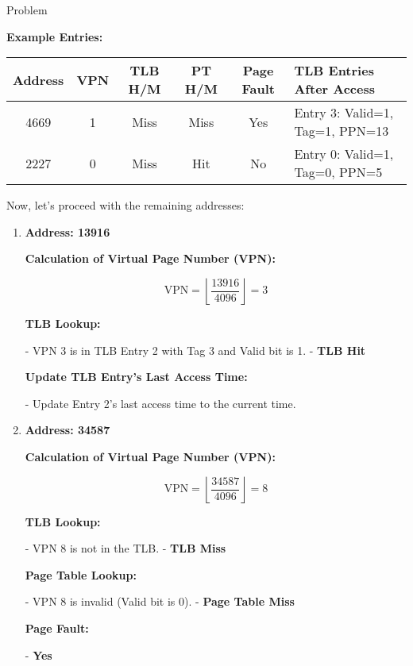 \begin{problem}{}{Problem}
	\bigskip
	
	\textbf{Example Entries:}
	
	\begin{center}
		\begin{tabular}{|c|c|c|c|c|l|}
			\hline
			\textbf{Address} & \textbf{VPN} & \textbf{TLB H/M} & \textbf{PT H/M} & \textbf{Page Fault} & \textbf{TLB Entries After Access} \\
			\hline
			4669 & 1 & Miss & Miss & Yes & Entry 3: Valid=1, Tag=1, PPN=13 \\
			\hline
			2227 & 0 & Miss & Hit & No & Entry 0: Valid=1, Tag=0, PPN=5 \\
			\hline
		\end{tabular}
	\end{center}
	
	\bigskip
	
	Now, let's proceed with the remaining addresses:
	
	\begin{enumerate}[label=\arabic*.]
		\item \textbf{Address: 13916}
		
		\textbf{Calculation of Virtual Page Number (VPN):}
		
		\[
		\text{VPN} = \left\lfloor \dfrac{13916}{4096} \right\rfloor = 3
		\]
		
		\textbf{TLB Lookup:}
		
		- VPN 3 is in TLB Entry 2 with Tag 3 and Valid bit is 1.
		- \textbf{TLB Hit}
		
		\textbf{Update TLB Entry's Last Access Time:}
		
		- Update Entry 2's last access time to the current time.
		
		\bigskip
		
		\item \textbf{Address: 34587}
		
		\textbf{Calculation of Virtual Page Number (VPN):}
		
		\[
		\text{VPN} = \left\lfloor \dfrac{34587}{4096} \right\rfloor = 8
		\]
		
		\textbf{TLB Lookup:}
		
		- VPN 8 is not in the TLB.
		- \textbf{TLB Miss}
		
		\textbf{Page Table Lookup:}
		
		- VPN 8 is invalid (Valid bit is 0).
		- \textbf{Page Table Miss}
		
		\textbf{Page Fault:}
		
		- \textbf{Yes}
		

\end{enumerate}
\end{problem}

